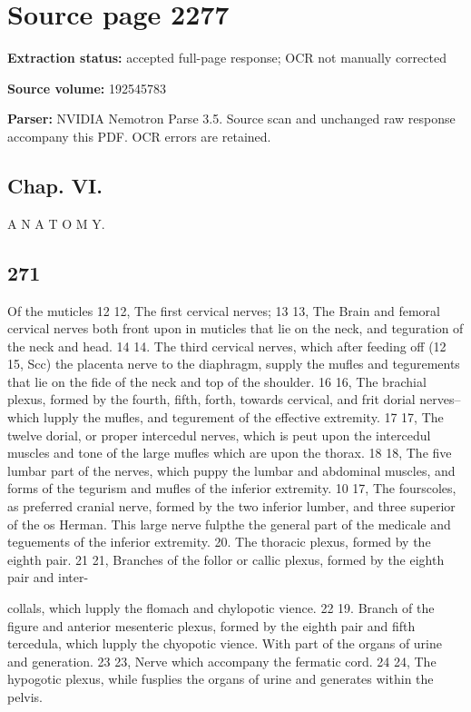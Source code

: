 \clearpage
\section{Source page 2277}
\textbf{Extraction status:} accepted full-page response; OCR not manually corrected\par
\textbf{Source volume:} 192545783\par
\textbf{Parser:} NVIDIA Nemotron Parse 3.5. Source scan and unchanged raw response accompany this PDF. OCR errors are retained.\par\medskip
\subsection*{Chap. VI.}
A N A T O M Y.\par\medskip
\subsection*{271}
Of the muticles 12 12, The first cervical nerves; 13 13, The Brain and femoral cervical nerves both front upon in muticles that lie on the neck, and teguration of the neck and head. 14 14. The third cervical nerves, which after feeding off (12 15, Scc) the placenta nerve to the diaphragm, supply the mufles and tegurements that lie on the fide of the neck and top of the shoulder. 16 16, The brachial plexus, formed by the fourth, fifth, forth, towards cervical, and frit dorial nerves--which lupply the mufles, and tegurement of the effective extremity. 17 17, The twelve dorial, or proper intercedul nerves, which is peut upon the intercedul muscles and tone of the large mufles which are upon the thorax. 18 18, The five lumbar part of the nerves, which puppy the lumbar and abdominal muscles, and forms of the tegurism and mufles of the inferior extremity. 10 17, The fourscoles, as preferred cranial nerve, formed by the two inferior lumber, and three superior of the os Herman. This large nerve fulpthe the general part of the medicale and teguements of the inferior extremity. 20. The thoracic plexus, formed by the eighth pair. 21 21, Branches of the follor or callic plexus, formed by the eighth pair and inter-\par\medskip
collals, which lupply the flomach and chylopotic vience. 22 19. Branch of the figure and anterior mesenteric plexus, formed by the eighth pair and fifth tercedula, which lupply the chyopotic vience. With part of the organs of urine and generation. 23 23, Nerve which accompany the fermatic cord. 24 24, The hypogotic plexus, while fusplies the organs of urine and generates within the pelvis.\par\medskip
